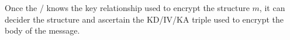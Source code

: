Once the \TMA/ knows the key relationship used to encrypt the structure $m$,
it can decider the structure and ascertain the KD/IV/KA triple used to
encrypt the body of the message.

